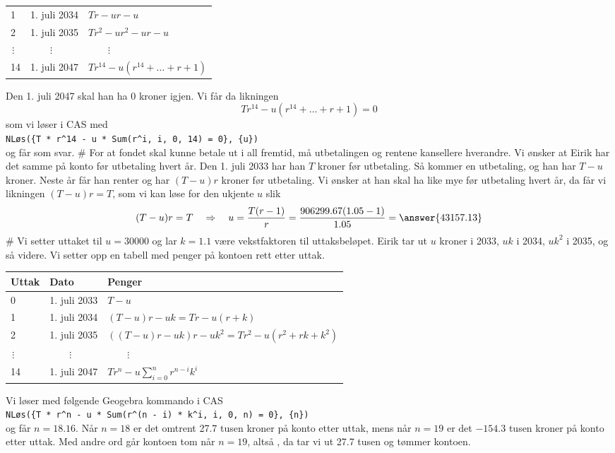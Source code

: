 \begin{easylist}[enumerate]
\begin{center}
\begin{tabular}{lll}
			1 & 1. juli 2034 & $Tr - ur - u$ \\
			2 & 1. juli 2035 & $Tr^2 -ur^2 - ur - u$ \\
			$\, \vdots$ & $\qquad \vdots$ & $\qquad \vdots$ \\
			14 & 1. juli 2047 & $Tr^{14} - u \left(r^{14} + \dots + r + 1\right)$  
		\end{tabular}
	\end{center}
	 Den 1. juli 2047 skal han ha $0$ kroner igjen. Vi får da likningen 
	 \begin{equation*}
	 	Tr^{14} - u \left(r^{14} + \dots + r + 1\right) = 0
	 \end{equation*}
	 som vi løser i CAS med \\
	 \verb|NLøs({T * r^14 - u * Sum(r^i, i, 0, 14) = 0}, {u})| \\
	 og får  som svar.
	# For at fondet skal kunne betale ut i all fremtid, må utbetalingen og rentene kansellere hverandre.
	Vi ønsker at Eirik har det samme på konto før utbetaling hvert år.
	Den 1. juli 2033 har han $T$ kroner før utbetaling. 
	Så kommer en utbetaling, og han har $T - u$ kroner.
	Neste år får han renter og har $(T-u)r$ kroner før utbetaling.
	Vi ønsker at han skal ha like mye før utbetaling hvert år, da får vi likningen $(T - u)r = T$, som vi kan løse for den ukjente $u$ slik
	\begin{equation*}
		(T - u)r = T \quad \Rightarrow \quad u = \frac{T(r-1)}{r}
		 = \frac{906299.67(1.05-1)}{1.05} = \answer{43157.13}
	\end{equation*}
	# Vi setter uttaket til $u = 30000$ og lar $k = 1.1$ være vekstfaktoren til uttaksbeløpet.
	Eirik tar ut $u$ kroner i 2033, $uk$ i 2034, $uk^2$ i 2035, og så videre.
	Vi setter opp en tabell med penger på kontoen rett etter uttak.
	\begin{center}
	\begin{tabular}{lll}
		\textbf{Uttak} & \textbf{Dato} & \textbf{Penger} \\ \hline
		0 & 1. juli 2033 & $T - u$ \\
		1 & 1. juli 2034 & $(T-u)r - uk = Tr - u(r + k)$ \\
		2 & 1. juli 2035 & $((T-u)r - uk)r - uk^2 = Tr^2 - u(r^2 +rk + k^2)$ \\
		$\, \vdots$ & $\qquad \vdots$ & $\qquad \vdots$ \\
		14 & 1. juli 2047 & $Tr^n - u \sum_{i=0}^{n} r^{n-i} k^i$  
	\end{tabular}
	\end{center}
	Vi løser med følgende Geogebra kommando i CAS \\
	\verb|NLøs({T * r^n - u * Sum(r^(n - i) * k^i, i, 0, n) = 0}, {n})| \\
	og får $n = 18.16$.
	Når $n = 18$ er det omtrent 27.7 tusen kroner på konto etter uttak, mens når $n = 19$ er det $-154.3$ tusen kroner på konto etter uttak.
	Med andre ord går kontoen tom når $n=19$, altså , da tar vi ut 27.7 tusen og tømmer kontoen.
\end{easylist}
	
